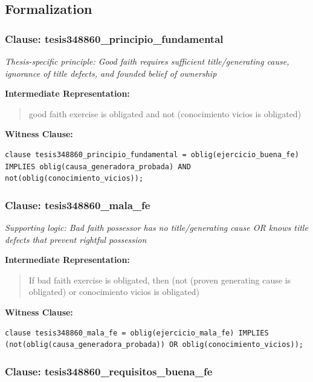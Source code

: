 \documentclass[11pt,a4paper]{article}
\begin{document}
\subsection{Formalization}

\subsubsection{Clause: tesis348860\_principio\_fundamental}

\textit{Thesis-specific principle: Good faith requires sufficient title/generating cause, ignorance of title defects, and founded belief of ownership}

\textbf{Intermediate Representation:}

\begin{quote}
good faith exercise is obligated and not (conocimiento vicios is obligated)
\end{quote}

\textbf{Witness Clause:}

\begin{lstlisting}[style=witnessstyle, language=Witness]
clause tesis348860_principio_fundamental = oblig(ejercicio_buena_fe) IMPLIES oblig(causa_generadora_probada) AND not(oblig(conocimiento_vicios));
\end{lstlisting}

\subsubsection{Clause: tesis348860\_mala\_fe}

\textit{Supporting logic: Bad faith possessor has no title/generating cause OR knows title defects that prevent rightful possession}

\textbf{Intermediate Representation:}

\begin{quote}
If bad faith exercise is obligated, then (not (proven generating cause is obligated) or conocimiento vicios is obligated)
\end{quote}

\textbf{Witness Clause:}

\begin{lstlisting}[style=witnessstyle, language=Witness]
clause tesis348860_mala_fe = oblig(ejercicio_mala_fe) IMPLIES (not(oblig(causa_generadora_probada)) OR oblig(conocimiento_vicios));
\end{lstlisting}

\subsubsection{Clause: tesis348860\_requisitos\_buena\_fe}
\end{document}
